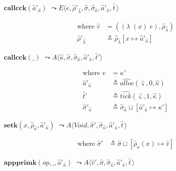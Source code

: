 \documentclass[12pt,draft]{article}
\newcommand{\singlelamsyn}[2]{(\lambda\;(#1)\;#2)}
\begin{document}
\begin{multicols*}{2}
\begin{center}
  $\textbf{callcck}(\hat{a}'_{\hat{\kappa}})$
  $\leadsto E\langle e , \hat{\rho}'_{\hat{\lambda}} , \hat{\sigma} , \hat{\sigma}_{\hat{\kappa}} , \hat{a}'_{\hat{\kappa}} , \hat{t}\,\rangle$
\end{center}
\vspace{-7mm}
\begin{align*}
\text{where } \hat{v} &= (\singlelamsyn{x}{e} , \hat{\rho}_{\hat{\lambda}}) \\
\hat{\rho}'_{\hat{\lambda}} &\triangleq \hat{\rho}_{\hat{\lambda}}[x \mapsto \hat{a}'_{\hat{\kappa}}]
\end{align*}
\begin{center}
  $\textbf{callcck}(\_)$
  $\leadsto A\langle \hat{\kappa} , \hat{\sigma} , \hat{\sigma}_{\hat{\kappa}} , \hat{a}'_{\hat\kappa}  , \hat{t}'\rangle$
\end{center}
\vspace{-7mm}
\begin{align*}
\text{where } v &= \kappa' \\
  \hat{a}'_{\hat\kappa} &\triangleq \widehat{alloc}(\hat{\varsigma}, 0, \hat{\kappa}) \\
  \hat{t}' &\triangleq \widehat{tick}(\hat{\varsigma}, 1, \hat{\kappa}) \\
  \hat{\sigma}'_{\hat{\kappa}} &\triangleq \hat{\sigma}_{\hat{\kappa}} \sqcup [\hat{a}'_{\hat{\kappa}} \mapsto \kappa']
\end{align*}
\begin{center}
  $\textbf{setk}(x, \hat{\rho}_{\hat{\kappa}}, \hat{a}'_{\hat{\kappa}})$
  $\leadsto A\langle \textit{Void} , \hat{\sigma}' , \hat{\sigma}_{\hat{\kappa}} , \hat{a}'_{\hat{\kappa}} , \hat{t}\,\rangle$
\end{center}
\vspace{-7mm}
\begin{align*}
\text{where } \hat{\sigma}' &\triangleq \hat{\sigma} \sqcup [\hat{\rho}_{\hat{\kappa}}(x) \mapsto \hat{v}]
\end{align*}
\begin{center}
  $\textbf{appprimk}(op, \_, \hat{a}'_{\hat{\kappa}})$
  $\leadsto A\langle \hat{v}' , \hat{\sigma} , \hat{\sigma}_{\hat{\kappa}} , \hat{a}'_{\hat{\kappa}} , \hat{t}\,\rangle$

\end{center}
\end{multicols*}
\end{document}
